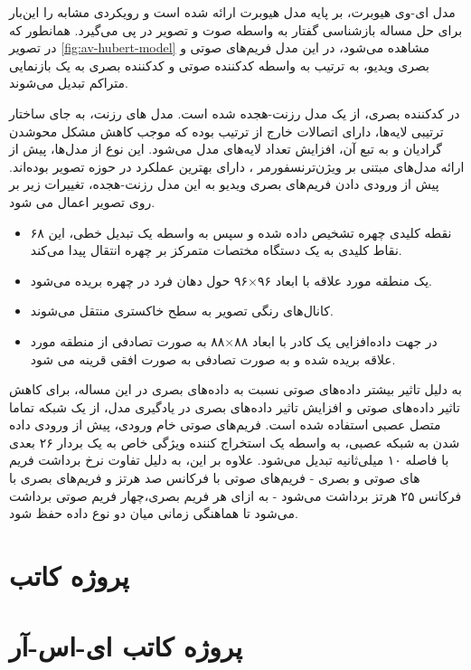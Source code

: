 مدل ای-وی هیوبرت، بر پایه مدل هیوبرت ارائه شده است و رویکردی مشابه را این‌بار برای حل مساله بازشناسی گفتار به واسطه صوت و تصویر در پی می‌گیرد. همانطور که در تصویر 
\ref{fig:av-hubert-model}
مشاهده می‌شود، در این مدل فریم‌های صوتی و بصری ویدیو، به ترتیب به واسطه کدکننده صوتی و کدکننده بصری به یک بازنمایی متراکم
تبدیل می‌شوند.

در کدکننده بصری، از یک مدل رزنت-هجده 
شده است. مدل های رزنت، به جای ساختار ترتیبی لایه‌ها، دارای اتصالات خارج از ترتیب بوده که موجب کاهش مشکل محوشدن گرادیان
و به تبع آن، افزایش تعداد لایه‌های مدل می‌شود. این نوع از مدل‌ها، پیش از ارائه مدل‌های مبتنی بر ویژن‌ترنسفورمر
، دارای بهترین عملکرد در حوزه تصویر بوده‌اند. پیش از ورودی دادن فریم‌های بصری ویدیو به این مدل رزنت-هجده، تغییرات زیر بر روی تصویر اعمال می شود.

\begin{itemize}
	\item ۶۸ نقطه کلیدی چهره تشخیص داده شده و سپس به واسطه یک تبدیل خطی، این نقاط کلیدی به یک دستگاه مختصات متمرکز بر چهره انتقال پیدا می‌کند.
	\item یک منطقه مورد علاقه
	با ابعاد ۹۶×۹۶ حول دهان فرد در چهره بریده می‌شود.
	\item کانال‌های رنگی تصویر به سطح خاکستری منتقل می‌شوند.
	\item در جهت داده‌افزایی
	یک کادر با ابعاد ۸۸×۸۸ به صورت تصادفی از منطقه مورد علاقه بریده شده و به صورت تصادفی به صورت افقی قرینه
	می شود.
\end{itemize}

به دلیل تاثیر بیشتر داده‌های صوتی نسبت به داده‌های بصری در این مساله، برای کاهش تاثیر داده‌های صوتی و افزایش تاثیر داده‌های بصری در یادگیری مدل، از یک شبکه تماما متصل عصبی استفاده شده است. فریم‌های صوتی خام ورودی، پیش از ورودی داده شدن به شبکه عصبی، به واسطه یک استخراج کننده ویژگی خاص
به یک بردار ۲۶ بعدی با فاصله ۱۰ میلی‌ثانیه تبدیل می‌شود. علاوه بر این، به دلیل تفاوت نرخ برداشت فریم های صوتی و بصری - فریم‌های صوتی با فرکانس صد هرتز و فریم‌های بصری با فرکانس ۲۵ هرتز برداشت می‌شود - به ازای هر فریم بصری،چهار فریم صوتی برداشت می‌شود تا هماهنگی زمانی میان دو نوع داده حفظ شود.

\section{پروژه کاتب}

\section{پروژه کاتب ای-اس-آر}